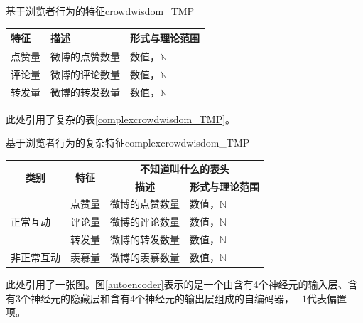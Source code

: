 \documentclass[a4paper,AutoFakeBold,oneside,12pt]{book}
\begin{document}
\begin{bupttable}{基于浏览者行为的特征}{crowdwisdom_TMP}

    \begin{tabular}{l|l|l}
		\hline \textbf{特征} & \textbf{描述} & \textbf{形式与理论范围}\\
		\hline 点赞量 & 微博的点赞数量 & 数值，$\mathbb{N}$ \\
		\hline 评论量 & 微博的评论数量 & 数值，$\mathbb{N}$ \\
		\hline 转发量 & 微博的转发数量 & 数值，$\mathbb{N}$ \\
		\hline
    \end{tabular}
\end{bupttable}

此处引用了复杂的表\ref{complexcrowdwisdom_TMP}。


\begin{bupttable}{基于浏览者行为的复杂特征}{complexcrowdwisdom_TMP}
    \begin{tabular}{l|l|l|l}
        \hline
        \multicolumn{1}{c|}{\multirow{2}{*}{\textbf{类别}}} & \multicolumn{1}{c|}{\multirow{2}{*}{\textbf{特征}}} & \multicolumn{2}{c}{\textbf{不知道叫什么的表头}} \\
        \cline{3-4}
        & & \multicolumn{1}{c|}{\textbf{描述}} & \multicolumn{1}{c}{\textbf{形式与理论范围}} \\
        \hline
        \multirow{3}{*}{正常互动} & 点赞量 & 微博的点赞数量 & 数值，$\mathbb{N}$ \\
        \cline{2-4}
        & 评论量 & 微博的评论数量 & 数值，$\mathbb{N}$ \\
        \cline{2-4}
        & 转发量 & 微博的转发数量 & 数值，$\mathbb{N}$ \\
        \hline
        非正常互动 & 羡慕量 & 微博的羡慕数量 & 数值，$\mathbb{N}$ \\
        \hline
    \end{tabular}
\end{bupttable}


此处引用了一张图。图\ref{autoencoder}表示的是一个由含有4个神经元的输入层、含有3个神经元的隐藏层和含有4个神经元的输出层组成的自编码器，$+1$代表偏置项。

\end{document}
